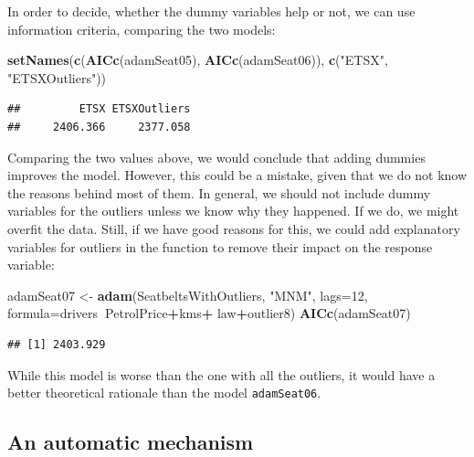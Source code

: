 \documentclass[]{book}
\newenvironment{Shaded}{\begin{snugshade}}{\end{snugshade}}
\newcommand{\DataTypeTok}[1]{\textcolor[rgb]{0.13,0.29,0.53}{#1}}
\newcommand{\DecValTok}[1]{\textcolor[rgb]{0.00,0.00,0.81}{#1}}
\newcommand{\KeywordTok}[1]{\textcolor[rgb]{0.13,0.29,0.53}{\textbf{#1}}}
\newcommand{\NormalTok}[1]{#1}
\newcommand{\OperatorTok}[1]{\textcolor[rgb]{0.81,0.36,0.00}{\textbf{#1}}}
\newcommand{\StringTok}[1]{\textcolor[rgb]{0.31,0.60,0.02}{#1}}
\theoremstyle{definition}
\theoremstyle{definition}
\theoremstyle{definition}
\theoremstyle{definition}
\theoremstyle{remark}
\begin{document}
In order to decide, whether the dummy variables help or not, we can use information criteria, comparing the two models:

\begin{Shaded}
\begin{Highlighting}[]
\KeywordTok{setNames}\NormalTok{(}\KeywordTok{c}\NormalTok{(}\KeywordTok{AICc}\NormalTok{(adamSeat05), }\KeywordTok{AICc}\NormalTok{(adamSeat06)),}
         \KeywordTok{c}\NormalTok{(}\StringTok{"ETSX"}\NormalTok{, }\StringTok{"ETSXOutliers"}\NormalTok{))}
\end{Highlighting}
\end{Shaded}

\begin{verbatim}
##         ETSX ETSXOutliers 
##     2406.366     2377.058
\end{verbatim}

Comparing the two values above, we would conclude that adding dummies improves the model. However, this could be a mistake, given that we do not know the reasons behind most of them. In general, we should not include dummy variables for the outliers unless we know why they happened. If we do, we might overfit the data. Still, if we have good reasons for this, we could add explanatory variables for outliers in the function to remove their impact on the response variable:

\begin{Shaded}
\begin{Highlighting}[]
\NormalTok{adamSeat07 <-}\StringTok{ }\KeywordTok{adam}\NormalTok{(SeatbeltsWithOutliers, }\StringTok{"MNM"}\NormalTok{, }\DataTypeTok{lags=}\DecValTok{12}\NormalTok{,}
                   \DataTypeTok{formula=}\NormalTok{drivers}\OperatorTok{~}\NormalTok{PetrolPrice}\OperatorTok{+}\NormalTok{kms}\OperatorTok{+}
\StringTok{                     }\NormalTok{law}\OperatorTok{+}\NormalTok{outlier8)}
\KeywordTok{AICc}\NormalTok{(adamSeat07)}
\end{Highlighting}
\end{Shaded}

\begin{verbatim}
## [1] 2403.929
\end{verbatim}

While this model is worse than the one with all the outliers, it would have a better theoretical rationale than the model \texttt{adamSeat06}.

\hypertarget{an-automatic-mechanism}{%
\subsection{An automatic mechanism}\label{an-automatic-mechanism}}
\end{document}
